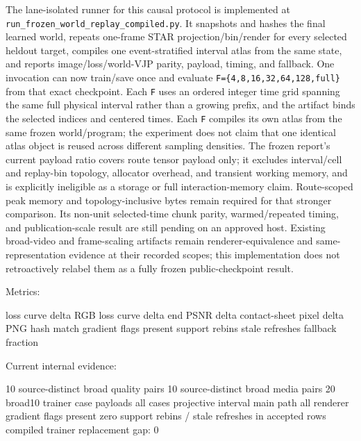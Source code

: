\documentclass[
]{article}
\newenvironment{Shaded}{}{}
\newcommand{\NormalTok}[1]{#1}
\begin{document}
The lane-isolated runner for this causal protocol is implemented at
\texttt{run\_frozen\_world\_replay\_compiled.py}. It snapshots and
hashes the final learned world, repeats one-frame STAR
projection/bin/render for every selected heldout target, compiles one
event-stratified interval atlas from the same state, and reports
image/loss/world-VJP parity, payload, timing, and fallback. One
invocation can now train/save once and evaluate
\texttt{F=\{4,8,16,32,64,128,full\}} from that exact checkpoint. Each
\texttt{F} uses an ordered integer time grid spanning the same full
physical interval rather than a growing prefix, and the artifact binds
the selected indices and centered times. Each \texttt{F} compiles its
own atlas from the same frozen world/program; the experiment does not
claim that one identical atlas object is reused across different
sampling densities. The frozen report's current payload ratio covers
route tensor payload only; it excludes interval/cell and replay-bin
topology, allocator overhead, and transient working memory, and is
explicitly ineligible as a storage or full interaction-memory claim.
Route-scoped peak memory and topology-inclusive bytes remain required
for that stronger comparison. Its non-unit selected-time chunk parity,
warmed/repeated timing, and publication-scale result are still pending
on an approved host. Existing broad-video and frame-scaling artifacts
remain renderer-equivalence and same-representation evidence at their
recorded scopes; this implementation does not retroactively relabel them
as a fully frozen public-checkpoint result.

Metrics:

\begin{Shaded}
\begin{Highlighting}[]
\NormalTok{loss curve delta}
\NormalTok{RGB loss curve delta}
\NormalTok{end PSNR delta}
\NormalTok{contact{-}sheet pixel delta}
\NormalTok{PNG hash match}
\NormalTok{gradient flags present}
\NormalTok{support rebins}
\NormalTok{stale refreshes}
\NormalTok{fallback fraction}
\end{Highlighting}
\end{Shaded}

Current internal evidence:

\begin{Shaded}
\begin{Highlighting}[]
\NormalTok{10 source{-}distinct broad quality pairs}
\NormalTok{10 source{-}distinct broad media pairs}
\NormalTok{20 broad10 trainer case payloads}
\NormalTok{all cases projective interval main path}
\NormalTok{all renderer gradient flags present}
\NormalTok{zero support rebins / stale refreshes in accepted rows}
\NormalTok{compiled trainer replacement gap: 0}
\end{Highlighting}
\end{Shaded}
\end{document}
